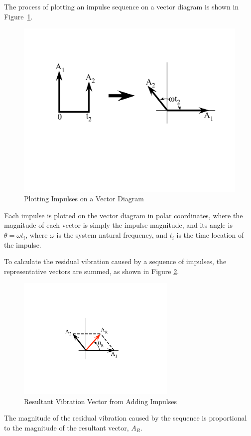 The process of plotting an impulse sequence on a vector diagram is shown in Figure~\ref{fig:vector_2imp}. 
%
\begin{figure}[tb!]
\begin{center}
\includegraphics[width = 4.5in]{Figures/Ch3/input_shaping/vector_diagram_2imp}
\caption{Plotting Impulses on a Vector Diagram}
\label{fig:vector_2imp}
\end{center}
\end{figure}
%
Each impulse is plotted on the vector diagram in polar coordinates, where the magnitude of each vector is simply the impulse magnitude, and its angle is $\theta = \omega t_i$, where $\omega$ is the system natural frequency, and $t_i$ is the time location of the impulse.

To calculate the residual vibration caused by a sequence of impulses, the representative vectors are summed, as shown in Figure \ref{fig:vector_result}. 
%
\begin{figure}[tb!]
\begin{center}
\includegraphics[width = 3in]{Figures/Ch3/input_shaping/vector_diagram_result}
\caption{Resultant Vibration Vector from Adding Impulses}
\label{fig:vector_result}
\end{center}
\end{figure}
%
The magnitude of the residual vibration caused by the sequence is proportional to the magnitude of the resultant vector, $A_R$.

